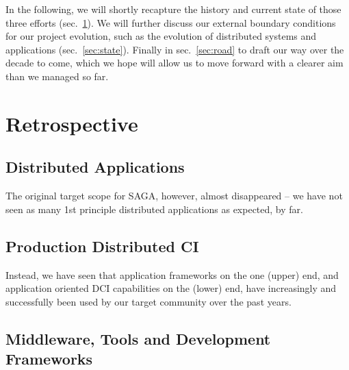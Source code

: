 \documentclass{article}
\begin{document}
In the following, we will shortly recapture the history and current
state of those three efforts (sec.~\ref{sec:retro}).  We will further
discuss our external boundary conditions for our project evolution,
such as the evolution of distributed systems and applications
(sec.~\ref{sec:state}).  Finally in sec.~\ref{sec:road} to draft our
way over the decade to come, which we hope will allow us to move
forward with a clearer aim than we managed so far.





\section{Retrospective}
\label{sec:retro}

 \subsection{Distributed Applications}

  The original target scope for SAGA, however, almost disappeared --
  we have not seen as many 1st principle distributed applications as
  expected, by far.


 \subsection{Production Distributed CI}

  Instead, we have seen that application frameworks on the one (upper)
  end, and application oriented DCI capabilities on the (lower) end,
  have increasingly and successfully been used by our target community
  over the past years.


 \subsection{Middleware, Tools and Development Frameworks}
\end{document}
